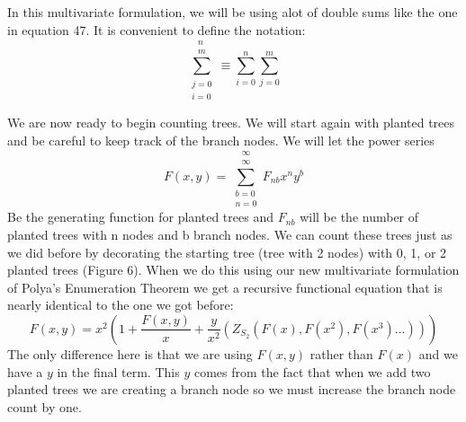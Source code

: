 \documentclass{article}
\begin{document}
In this multivariate formulation, we will be using alot of double sums like the one in equation 47. It is convenient to define the notation:
\begin{equation}
\sum_{\substack{j=0\\i=0}}^{\substack{n\\m}} \equiv  \sum_{i=0}^n \sum_{j=0}^m
\end{equation}

We are now ready to begin counting trees. We will start again with planted trees and be careful to keep track of the branch nodes. We will let the power series
\begin{equation}
F(x,y)=\sum_{\substack{b=0\\n=0}}^{\substack{\infty\\ \infty}} F_{nb} x^ny^b
\end{equation}
Be the generating function for planted trees and \(F_{nb}\) will be the number of planted trees with n nodes and b branch nodes. We can count these trees just as we did before by decorating the starting tree (tree with 2 nodes) with 0, 1, or 2 planted trees (Figure 6). When we do this using our new multivariate formulation of Polya's Enumeration Theorem we get a recursive functional equation that is nearly identical to the one we got before:
\begin{equation}
F(x,y)=x^2(1+\frac{F(x,y)}{x}+\frac{y}{x^2}(Z_{S_2}(F(x),F(x^2),F(x^3)...)))
\end{equation}
The only difference here is that we are using \(F(x,y)\) rather than \(F(x)\) and we have a \(y\) in the final term. This \(y\) comes from the fact that when we add two planted trees we are creating a branch node so we must increase the branch node count by one. 
\end{document}
